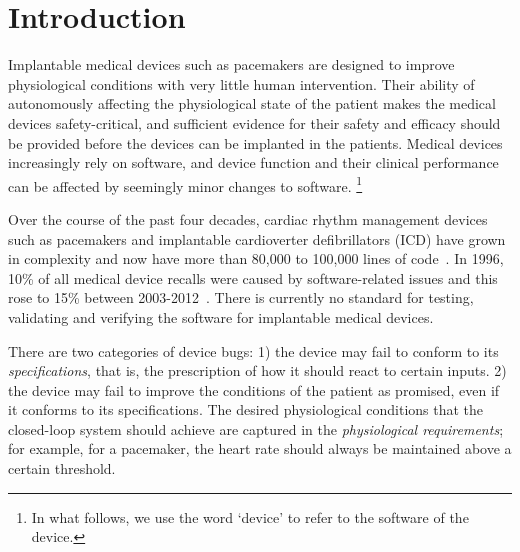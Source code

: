 \section{Introduction}
\label{introduction}

Implantable medical devices such as pacemakers are designed to improve physiological conditions with very little human intervention. 
Their ability of autonomously affecting the physiological state of the patient makes the medical devices safety-critical, and sufficient evidence for their safety and efficacy should be provided before the devices can be implanted in the patients. Medical devices increasingly rely on software, and device function and their clinical performance can be affected by seemingly minor changes to software.
\footnote{In what follows, we use the word `device' to refer to the software of the device.}

Over the course of the past four decades, cardiac rhythm management devices such as pacemakers and implantable cardioverter defibrillators (ICD) have grown in complexity and now have more than 80,000 to 100,000 lines of code~\cite{pauljones}. In 1996, 10\% of all medical device recalls were caused by software-related issues and this rose to 15\% between 2003-2012~\cite{recall_stats,killedbycode}. There is currently no standard for testing, validating and verifying the software for implantable medical devices.

There are two categories of device bugs: 
1) the device may fail to conform to its \emph{specifications}, that is, the prescription of how it should react to certain inputs.  
2) the device may fail to improve the conditions of the patient as promised, even if it conforms to its specifications. 
The desired physiological conditions that the closed-loop system should achieve are captured in the \emph{physiological requirements}; for example, for a pacemaker, the heart rate should always be maintained above a certain threshold. 

